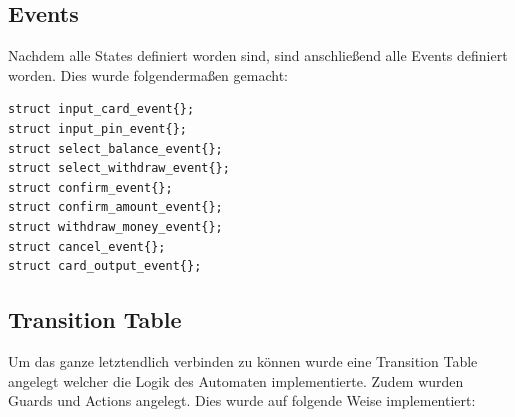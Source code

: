 \documentclass{report}
\begin{document}
\subsection{Events}
Nachdem alle States definiert worden sind, sind anschließend alle Events definiert worden. Dies wurde folgendermaßen gemacht:
\begin{lstlisting}
struct input_card_event{};
struct input_pin_event{};
struct select_balance_event{};
struct select_withdraw_event{};
struct confirm_event{};
struct confirm_amount_event{};
struct withdraw_money_event{};
struct cancel_event{};
struct card_output_event{};
\end{lstlisting}
\subsection{Transition Table}
Um das ganze letztendlich verbinden zu können wurde eine Transition Table angelegt welcher die Logik des Automaten implementierte. Zudem wurden Guards und Actions angelegt. Dies wurde auf folgende Weise implementiert:
\end{document}
